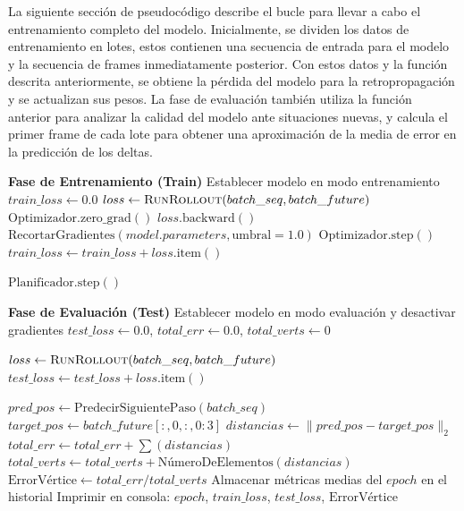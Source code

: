 La siguiente sección de pseudocódigo describe el bucle para llevar a cabo el entrenamiento completo del modelo. Inicialmente, se dividen los datos de entrenamiento en lotes, estos contienen una secuencia de entrada para el modelo y la secuencia de frames inmediatamente posterior. Con estos datos y la función descrita anteriormente, se obtiene la pérdida del modelo para la retropropagación y se actualizan sus pesos. La fase de evaluación también utiliza la función anterior para analizar la calidad del modelo ante situaciones nuevas, y calcula el primer frame de cada lote para obtener una aproximación de la media de error en la predicción de los deltas.

\begin{algorithm}[H]
\caption{Bucle de Entrenamiento y Validación}
\label{alg:training_loop}
\begin{algorithmic}[1]
    
    \State\textbf{Fase de Entrenamiento (Train)}
    \State Establecer modelo en modo entrenamiento
    \State $train\_loss \gets 0.0$
        \State $loss \gets \textsc{RunRollout}(batch\_seq, batch\_future)$
        \State $\text{Optimizador.zero\_grad}()$
        \State $loss.\text{backward}()$
        \State $\text{RecortarGradientes}(model.parameters, \text{umbral}=1.0)$
        \State $\text{Optimizador.step}()$
        \State $train\_loss \gets train\_loss + loss.\text{item}()$
    \EndFor

    \State $\text{Planificador.step}()$ 
    
    \State\textbf{Fase de Evaluación (Test)}
    \State Establecer modelo en modo evaluación y desactivar gradientes
    \State $test\_loss \gets 0.0$, $total\_err \gets 0.0$, $total\_verts \gets 0$

        \State $loss \gets \textsc{RunRollout}(batch\_seq, batch\_future)$
        \State $test\_loss \gets test\_loss + loss.\text{item}()$
        
        \State $pred\_pos \gets \text{PredecirSiguientePaso}(batch\_seq)$
        \State $target\_pos \gets batch\_future[:, 0, :, 0:3]$
        \State $distancias \gets \|pred\_pos - target\_pos\|_2$
        \State $total\_err \gets total\_err + \sum(distancias)$
        \State $total\_verts \gets total\_verts + \text{NúmeroDeElementos}(distancias)$
    \EndFor
    \State $\text{ErrorVértice} \gets total\_err  /  total\_verts$
    \State Almacenar métricas medias del $epoch$ en el historial
    \State Imprimir en consola: $epoch$, $train\_loss$, $test\_loss$, $\text{ErrorVértice}$
\EndFor
\end{algorithmic}
\end{algorithm}

